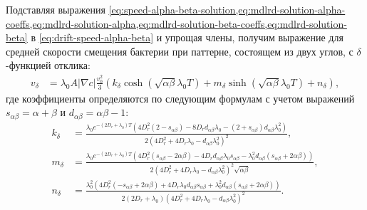 Подставляя выражения \cref{eq:speed-alpha-beta-solution,eq:mdlrd-solution-alpha-coeffs,eq:mdlrd-solution-alpha,eq:mdlrd-solution-beta-coeffs,eq:mdlrd-solution-beta} в \cref{eq:drift-speed-alpha-beta} и упрощая члены, получим выражение для средней скорости смещения бактерии при паттерне, состоящем из двух углов, с $\delta$-функцией отклика:
\begin{equation}
    \begin{aligned}
        v_{\delta}&=\lambda_0 A |\nabla c| \frac{v_0^2}{3} \left ( k_{\delta} \cosh\left (\sqrt{\alpha \beta} \lambda_0 T \right ) + m_{\delta} \sinh\left (\sqrt{\alpha \beta} \lambda_0 T \right ) + n_{\delta} \right ),
        \label{eq:mean-displacement-delta-response-solution}
    \end{aligned}
\end{equation}
где коэффициенты определяются по следующим формулам с учетом выражений $s_{\alpha\beta}=\alpha+\beta$ и $d_{\alpha\beta}=\alpha\beta-1$:
\begin{equation}
    \begin{aligned}
        k_{\delta}&=\frac{\lambda_0 e^{-(2D_r+\lambda_0)T}\left (4D_r^2(2-s_{\alpha\beta})-8D_r d_{\alpha\beta}\lambda_0-(2+s_{\alpha\beta})d_{\alpha\beta}\lambda_0^2 \right )}{2\left (4D_r^2+4D_r\lambda_0-d_{\alpha\beta}\lambda_0^2\right )^2}, \\
        m_{\delta}&=\frac{\lambda_0 e^{-(2D_r+\lambda_0)T}\left (4D_r^2(s_{\alpha\beta}-2\alpha\beta)-4D_rd_{\alpha\beta}\lambda_0s_{\alpha\beta}-\lambda_0^2d_{\alpha\beta}(s_{\alpha\beta}+2\alpha\beta)\right )}{2\left (4D_r^2+4D_r\lambda_0-d_{\alpha\beta}\lambda_0^2\right )^2\sqrt{\alpha\beta}}, \\
        n_{\delta}&=\frac{\lambda_0^2 \left (4D_r^2(-s_{\alpha\beta}+2\alpha\beta)+4D_r\lambda_0d_{\alpha\beta}s_{\alpha\beta}+\lambda_0^2d_{\alpha\beta}(s_{\alpha\beta}+2\alpha\beta)\right )}{2(2D_r+\lambda_0)\left (4D_r^2+4D_r\lambda_0-d_{\alpha\beta}\lambda_0^2\right )^2}. \\
        \label{eq:mddrs-coeffs}
    \end{aligned}
\end{equation}

